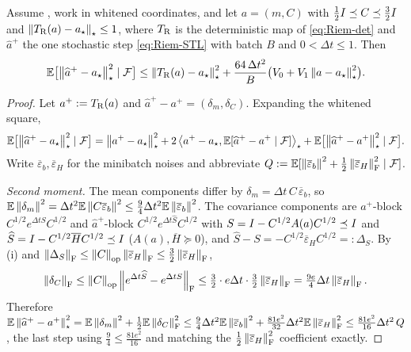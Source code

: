 \begin{lemma}
\label{lem:local-perturb-Riem}
Assume , work in whitened coordinates, and let
$a=(m,C)$ with $\tfrac12I\preceq C\preceq\tfrac32I$ and $\left\lVert T_{\mathrm{R}}(a)-a_\star\right\rVert_\star\leq1$,
where $T_{\mathrm{R}}$ is the deterministic map of \eqref{eq:Riem-det} and $\widehat a^+$ the one stochastic
step \eqref{eq:Riem-STL} with batch $B$ and $0<\Delta t\leq1$. Then
\[
    \mathbb{E}\bigl[\left\lVert \widehat a^+-a_\star\right\rVert_\star^2\mid\mathcal{F}\bigr]
    \leq\left\lVert T_{\mathrm{R}}(a)-a_\star\right\rVert_\star^2+\frac{64\,\Delta t^2}{B}\bigl(V_0+V_1\left\lVert a-a_\star\right\rVert_\star^2\bigr).
\]
\end{lemma}

\begin{proof}
Let $a^+:=T_{\mathrm{R}}(a)$ and $\widehat a^+-a^+=(\delta_m,\delta_C)$. Expanding the whitened square,
\begin{equation}
\label{eq:perturb-expand}
    \mathbb{E}\bigl[\left\lVert \widehat a^+-a_\star\right\rVert_\star^2\mid\mathcal{F}\bigr]
    =\left\lVert a^+-a_\star\right\rVert_\star^2
    +2\left\langle a^+-a_\star,\mathbb{E}[\widehat a^+-a^+\mid\mathcal{F}]\right\rangle_\star
    +\mathbb{E}\bigl[\left\lVert \widehat a^+-a^+\right\rVert_\star^2\mid\mathcal{F}\bigr].
\end{equation}
Write $\overline\varepsilon_b,\overline\varepsilon_H$ for the minibatch noises and abbreviate
$Q:=\mathbb{E}[\left\lVert \overline\varepsilon_b\right\rVert^2+\tfrac12\left\lVert \overline\varepsilon_H\right\rVert_{\mathrm{F}}^2\mid\mathcal{F}]$.

\emph{Second moment.} The mean components differ by $\delta_m=\Delta t\,C\,\overline\varepsilon_b$, so
$\mathbb{E}\left\lVert \delta_m\right\rVert^2=\Delta t^2\mathbb{E}\left\lVert C\overline\varepsilon_b\right\rVert^2\leq\tfrac94\Delta t^2\mathbb{E}\left\lVert \overline\varepsilon_b\right\rVert^2$.
The covariance components are $a^+$-block $C^{1/2}e^{\Delta tS}C^{1/2}$ and $\widehat a^+$-block
$C^{1/2}e^{\Delta t\widehat S}C^{1/2}$ with $S=I-C^{1/2}A(a)C^{1/2}\preceq I$ and
$\widehat S=I-C^{1/2}\overline H C^{1/2}\preceq I$ ($A(a),\overline H\succeq0$), and
$\widehat S-S=-C^{1/2}\overline\varepsilon_H C^{1/2}=:\Delta_S$. By (i) and
$\left\lVert \Delta_S\right\rVert_{\mathrm{F}}\leq\left\lVert C\right\rVert_{\mathrm{op}}\left\lVert \overline\varepsilon_H\right\rVert_{\mathrm{F}}\leq\tfrac32\left\lVert \overline\varepsilon_H\right\rVert_{\mathrm{F}}$,
\[
    \left\lVert \delta_C\right\rVert_{\mathrm{F}}\leq\left\lVert C\right\rVert_{\mathrm{op}}\left\lVert e^{\Delta t\widehat S}-e^{\Delta tS}\right\rVert_{\mathrm{F}}
    \leq\tfrac32\cdot e\Delta t\cdot\tfrac32\left\lVert \overline\varepsilon_H\right\rVert_{\mathrm{F}}
    =\tfrac{9e}{4}\Delta t\left\lVert \overline\varepsilon_H\right\rVert_{\mathrm{F}}.
\]
Therefore $\mathbb{E}\left\lVert \widehat a^+-a^+\right\rVert_\star^2=\mathbb{E}\left\lVert \delta_m\right\rVert^2+\tfrac12\mathbb{E}\left\lVert \delta_C\right\rVert_{\mathrm{F}}^2
\leq\tfrac94\Delta t^2\mathbb{E}\left\lVert \overline\varepsilon_b\right\rVert^2+\tfrac{81e^2}{32}\Delta t^2\mathbb{E}\left\lVert \overline\varepsilon_H\right\rVert_{\mathrm{F}}^2
\leq\tfrac{81e^2}{16}\Delta t^2\,Q$, the last step using $\tfrac94\leq\tfrac{81e^2}{16}$ and matching the
$\tfrac12\left\lVert \overline\varepsilon_H\right\rVert_{\mathrm{F}}^2$ coefficient exactly.


\end{proof}
